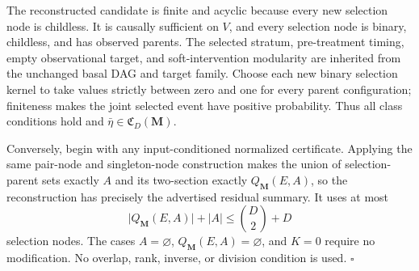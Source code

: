 The reconstructed candidate is finite and acyclic because every new selection node is childless.  It is causally sufficient on \(V\), and every selection node is binary, childless, and has observed parents.  The selected stratum, pre-treatment timing, empty observational target, and soft-intervention modularity are inherited from the unchanged basal DAG and target family.  Choose each new binary selection kernel to take values strictly between zero and one for every parent configuration; finiteness makes the joint selected event have positive probability.  Thus all class conditions hold and \(\bar\eta\in\mathfrak C_D(\mathbf M)\).

Conversely, begin with any input-conditioned normalized certificate.  Applying the same pair-node and singleton-node construction makes the union of selection-parent sets exactly \(A\) and its two-section exactly \(Q_{\mathbf M}(E,A)\), so the reconstruction has precisely the advertised residual summary.  It uses at most
\[
\lvert Q_{\mathbf M}(E,A)\rvert+\lvert A\rvert
\le \binom D2+D
\]
selection nodes.  The cases \(A=\varnothing\), \(Q_{\mathbf M}(E,A)=\varnothing\), and \(K=0\) require no modification.  No overlap, rank, inverse, or division condition is used. \(\square\)